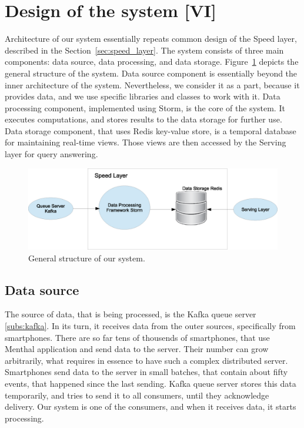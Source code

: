 \section{Design of the system [VI]}

Architecture of our system essentially repeats common design of the Speed layer, described in the Section~\ref{sec:speed_layer}.
The system consists of three main components: data source, data processing, and data storage.
Figure~\ref{fig:SpeedLayerArchitecture} depicts the general structure of the system.
Data source component is essentially beyond the inner architecture of the system.
Nevertheless, we consider it as a part, because it provides data, and we use specific libraries and classes to work with it.
Data processing component, implemented using Storm, is the core of the system.
It executes computations, and stores results to the data storage for further use.
Data storage component, that uses Redis key-value store, is a temporal database for maintaining real-time views.
Those views are then accessed by the Serving layer for query answering.

\begin{figure}[h]
  \centering
  \includegraphics [width=1.0\textwidth]{images/SpeedLayerArchitecture}
  \caption{General structure of our system.}
  \label{fig:SpeedLayerArchitecture}
\end{figure}

\subsection{Data source}

The source of data, that is being processed, is the Kafka queue server \ref{subs:kafka}.
In its turn, it receives data from the outer sources, specifically from smartphones.
There are so far tens of thousends of smartphones, that use Menthal application and send data to the server.
Their number can grow arbitrarily, what requires in essence to have such a complex distributed server.
Smartphones send data to the server in small batches, that contain about fifty events, that happened since the last sending.
Kafka queue server stores this data temporarily, and tries to send it to all consumers, until they acknowledge delivery.
Our system is one of the consumers, and when it receives data, it starts processing. 

